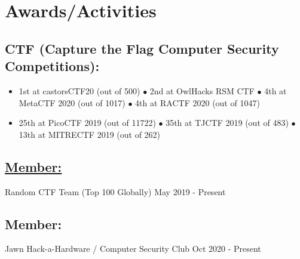 \documentclass{article}
\begin{document}
\section{Awards/Activities}
\subsection{CTF (Capture the Flag Computer Security Competitions):}
\begin{itemize}
    \item 1st at castorsCTF20 (out of 500) $\bullet$ 2nd at OwlHacks RSM CTF $\bullet$ 4th at MetaCTF 2020 (out of 1017) $\bullet$ 4th at RACTF 2020 (out of 1047)
    \item 25th at PicoCTF 2019 (out of 11722) $\bullet$ 35th at TJCTF 2019 (out of 483) $\bullet$ 13th at MITRECTF 2019 (out of 262)
\end{itemize} 
\subsection{\href{https://youtu.be/dQw4w9WgXcQ}{Member: }} Random CTF Team (Top 100 Globally) \hfill May 2019 - Present
\subsection{Member: } Jawn Hack-a-Hardware / Computer Security Club  \hfill Oct 2020 - Present
\end{document}
